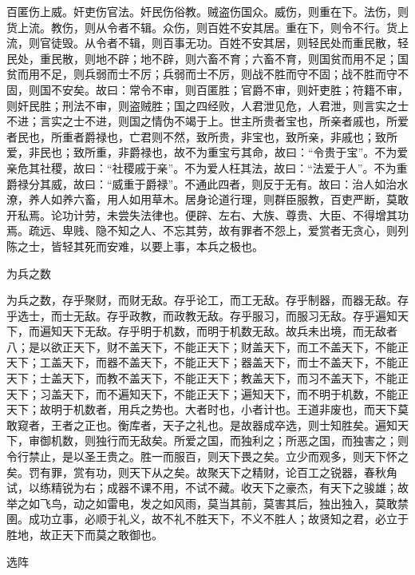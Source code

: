 \documentclass[]{article}
\begin{document}
百匿伤上威。奸吏伤官法。奸民伤俗教。贼盗伤国众。威伤，则重在下。法伤，则货上流。教伤，则从令者不辑。众伤，则百姓不安其居。重在下，则令不行。货上流，则官徒毁。从令者不辑，则百事无功。百姓不安其居，则轻民处而重民散，轻民处，重民散，则地不辟；地不辟，则六畜不育；六畜不育，则国贫而用不足；国贫而用不足，则兵弱而士不厉；兵弱而士不厉，则战不胜而守不固；战不胜而守不固，则国不安矣。故曰：常令不审，则百匿胜；官爵不审，则奸吏胜；符籍不审，则奸民胜；刑法不审，则盗贼胜；国之四经败，人君泄见危，人君泄，则言实之士不进；言实之士不进，则国之情伪不竭于上。世主所贵者宝也，所亲者戚也，所爱者民也，所重者爵禄也，亡君则不然，致所贵，非宝也，致所亲，非戚也；致所爱，非民也；致所重，非爵禄也，故不为重宝亏其命，故曰：``令贵于宝''。不为爱亲危其社稷，故曰：``社稷戚于亲''。不为爱人枉其法，故曰：``法爱于人''。不为重爵禄分其威，故曰：``威重于爵禄''。不通此四者，则反于无有。故曰：治人如治水潦，养人如养六畜，用人如用草木。居身论道行理，则群臣服教，百吏严断，莫敢开私焉。论功计劳，未尝失法律也。便辟、左右、大族、尊贵、大臣、不得增其功焉。疏远、卑贱、隐不知之人、不忘其劳，故有罪者不怨上，爱赏者无贪心，则列陈之士，皆轻其死而安难，以要上事，本兵之极也。

为兵之数

为兵之数，存乎聚财，而财无敌。存乎论工，而工无敌。存乎制器，而器无敌。存乎选士，而士无敌。存乎政教，而政教无敌。存乎服习，而服习无敌。存乎遍知天下，而遍知天下无敌。存乎明于机数，而明于机数无敌。故兵未出境，而无敌者八；是以欲正天下，财不盖天下，不能正天下；财盖天下，而工不盖天下，不能正天下；工盖天下，而器不盖天下，不能正天下；器盖天下，而士不盖天下，不能正天下；士盖天下，而教不盖天下，不能正天下；教盖天下，而习不盖天下，不能正天下；习盖天下，而不遍知天下，不能正天下；遍知天下，而不明于机数，不能正天下；故明于机数者，用兵之势也。大者时也，小者计也。王道非废也，而天下莫敢窥者，王者之正也。衡库者，天子之礼也。是故器成卒选，则士知胜矣。遍知天下，审御机数，则独行而无敌矣。所爱之国，而独利之；所恶之国，而独害之；则令行禁止，是以圣王贵之。胜一而服百，则天下畏之矣。立少而观多，则天下怀之矣。罚有罪，赏有功，则天下从之矣。故聚天下之精财，论百工之锐器，春秋角试，以练精锐为右；成器不课不用，不试不藏。收天下之豪杰，有天下之骏雄；故举之如飞鸟，动之如雷电，发之如风雨，莫当其前，莫害其后，独出独入，莫敢禁圉。成功立事，必顺于礼义，故不礼不胜天下，不义不胜人；故贤知之君，必立于胜地，故正天下而莫之敢御也。

选阵
\end{document}
